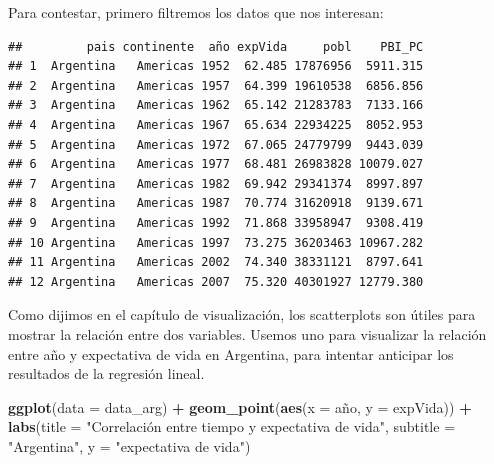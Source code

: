 \documentclass[]{book}
\newenvironment{Shaded}{\begin{snugshade}}{\end{snugshade}}
\newcommand{\KeywordTok}[1]{\textcolor[rgb]{0.13,0.29,0.53}{\textbf{#1}}}
\newcommand{\DataTypeTok}[1]{\textcolor[rgb]{0.13,0.29,0.53}{#1}}
\newcommand{\StringTok}[1]{\textcolor[rgb]{0.31,0.60,0.02}{#1}}
\newcommand{\OperatorTok}[1]{\textcolor[rgb]{0.81,0.36,0.00}{\textbf{#1}}}
\newcommand{\NormalTok}[1]{#1}
\begin{document}
Para contestar, primero filtremos los datos que nos interesan:

\begin{Shaded}
\end{Shaded}

\begin{verbatim}
##         pais continente  año expVida     pobl    PBI_PC
## 1  Argentina   Americas 1952  62.485 17876956  5911.315
## 2  Argentina   Americas 1957  64.399 19610538  6856.856
## 3  Argentina   Americas 1962  65.142 21283783  7133.166
## 4  Argentina   Americas 1967  65.634 22934225  8052.953
## 5  Argentina   Americas 1972  67.065 24779799  9443.039
## 6  Argentina   Americas 1977  68.481 26983828 10079.027
## 7  Argentina   Americas 1982  69.942 29341374  8997.897
## 8  Argentina   Americas 1987  70.774 31620918  9139.671
## 9  Argentina   Americas 1992  71.868 33958947  9308.419
## 10 Argentina   Americas 1997  73.275 36203463 10967.282
## 11 Argentina   Americas 2002  74.340 38331121  8797.641
## 12 Argentina   Americas 2007  75.320 40301927 12779.380
\end{verbatim}

Como dijimos en el capítulo de visualización, los scatterplots son
útiles para mostrar la relación entre dos variables. Usemos uno para
visualizar la relación entre año y expectativa de vida en Argentina,
para intentar anticipar los resultados de la regresión lineal.

\begin{Shaded}
\begin{Highlighting}[]
\KeywordTok{ggplot}\NormalTok{(}\DataTypeTok{data =}\NormalTok{ data_arg) }\OperatorTok{+}\StringTok{ }
\StringTok{    }\KeywordTok{geom_point}\NormalTok{(}\KeywordTok{aes}\NormalTok{(}\DataTypeTok{x =}\NormalTok{ año, }\DataTypeTok{y =}\NormalTok{ expVida)) }\OperatorTok{+}
\StringTok{    }\KeywordTok{labs}\NormalTok{(}\DataTypeTok{title =} \StringTok{"Correlación entre tiempo y expectativa de vida"}\NormalTok{,}
         \DataTypeTok{subtitle =} \StringTok{"Argentina"}\NormalTok{,}
         \DataTypeTok{y =} \StringTok{"expectativa de vida"}\NormalTok{)}
\end{Highlighting}
\end{Shaded}
\end{document}

